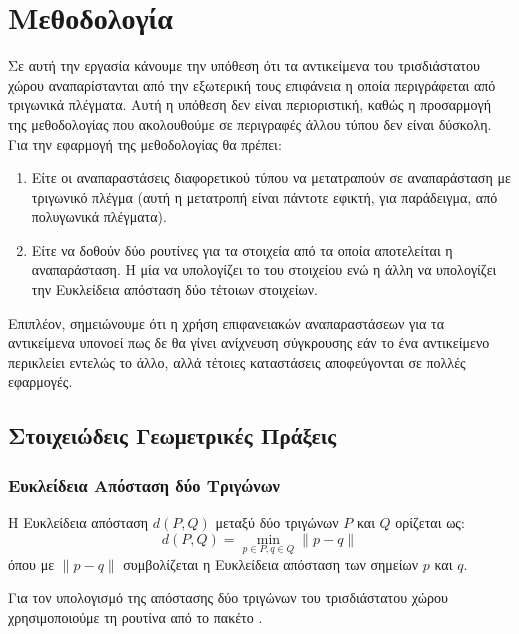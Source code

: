 \chapter{Μεθοδολογία}
\label{ch:methodology}

Σε αυτή την εργασία κάνουμε την υπόθεση ότι τα αντικείμενα του 
τρισδιάστατου χώρου αναπαρίστανται από την εξωτερική τους επιφάνεια 
η οποία περιγράφεται από τριγωνικά πλέγματα. 
Αυτή η υπόθεση δεν είναι περιοριστική, καθώς η προσαρμογή της μεθοδολογίας 
που ακολουθούμε σε περιγραφές άλλου τύπου δεν είναι δύσκολη.
Για την εφαρμογή της μεθοδολογίας θα πρέπει:
\begin{enumerate}
    \item Είτε οι αναπαραστάσεις διαφορετικού τύπου να μετατραπούν σε αναπαράσταση 
    με τριγωνικό πλέγμα (αυτή η μετατροπή είναι πάντοτε εφικτή, για παράδειγμα, 
    από πολυγωνικά πλέγματα).
    \item Είτε να δοθούν δύο ρουτίνες για τα στοιχεία από τα οποία αποτελείται η 
    αναπαράσταση. Η μία να υπολογίζει το  του στοιχείου 
    ενώ η άλλη να υπολογίζει την Ευκλείδεια απόσταση δύο τέτοιων στοιχείων.
\end{enumerate}
Επιπλέον, σημειώνουμε ότι η χρήση επιφανειακών αναπαραστάσεων για τα αντικείμενα 
υπονοεί πως δε θα γίνει ανίχνευση σύγκρουσης εάν το ένα αντικείμενο περικλείει 
εντελώς το άλλο, αλλά τέτοιες καταστάσεις αποφεύγονται σε πολλές εφαρμογές.


\section{Στοιχειώδεις Γεωμετρικές Πράξεις}
\subsection{Ευκλείδεια Απόσταση δύο Τριγώνων}
\label{subsec:tria_distance}
Η Ευκλείδεια απόσταση $d(P,Q)$ μεταξύ δύο τριγώνων $P$ και $Q$
ορίζεται ως:
\[ d(P,Q) = \min_{p \in P, q \in Q} \lVert p - q \rVert \]
όπου με $\lVert p - q \rVert$ συμβολίζεται η Ευκλείδεια 
απόσταση των σημείων $p$ και $q$.

Για τον υπολογισμό της απόστασης δύο τριγώνων του τρισδιάστατου χώρου 
χρησιμοποιούμε τη ρουτίνα  από το πακέτο 
 \cite{larsen2014pqp} \cite{larsen1999fast}. 

